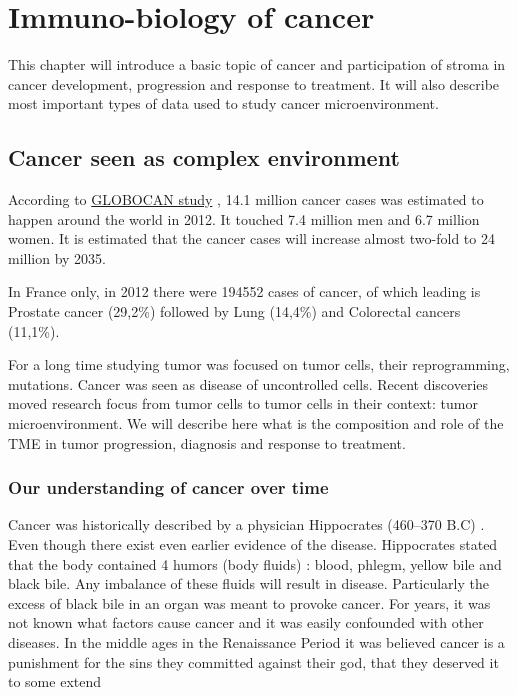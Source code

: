 \documentclass[12pt,]{book}
\theoremstyle{definition}
\theoremstyle{definition}
\theoremstyle{definition}
\theoremstyle{remark}
\begin{document}
{
\hypersetup{linkcolor=black}
\setcounter{tocdepth}{4}
\tableofcontents
}
\hypersetup{linkcolor=black}
\listoftables

\hypersetup{linkcolor=black}
\listoffigures
\hypertarget{intro}{%
\chapter{Immuno-biology of cancer}\label{intro}}

\setcounter{page}{11}

This chapter will introduce a basic topic of cancer and participation of
stroma in cancer development, progression and response to treatment. It
will also describe most important types of data used to study cancer
microenvironment.

\hypertarget{cancer-seen-as-complex-environment}{%
\section{Cancer seen as complex
environment}\label{cancer-seen-as-complex-environment}}

According to
\href{http://globocan.iarc.fr/Pages/fact_sheets_cancer.aspx}{GLOBOCAN
study} \citep{GLOBOCAN}, 14.1 million cancer cases was estimated to
happen around the world in 2012. It touched 7.4 million men and 6.7
million women. It is estimated that the cancer cases will increase
almost two-fold to 24 million by 2035.

In France only, in 2012 there were 194552 cases of cancer, of which
leading is Prostate cancer (29,2\%) followed by Lung (14,4\%) and
Colorectal cancers (11,1\%).

For a long time studying tumor was focused on tumor cells, their
reprogramming, mutations. Cancer was seen as disease of uncontrolled
cells. Recent discoveries moved research focus from tumor cells to tumor
cells in their context: tumor microenvironment. We will describe here
what is the composition and role of the TME in tumor progression,
diagnosis and response to treatment.

\hypertarget{our-understanding-of-cancer-over-time}{%
\subsection{Our understanding of cancer over
time}\label{our-understanding-of-cancer-over-time}}

Cancer was historically described by a physician Hippocrates (460--370
B.C) \citep{Sudhakar2009}. Even though there exist even earlier evidence
of the disease. Hippocrates stated that the body contained 4 humors
(body fluids) : blood, phlegm, yellow bile and black bile. Any imbalance
of these fluids will result in disease. Particularly the excess of black
bile in an organ was meant to provoke cancer. For years, it was not
known what factors cause cancer and it was easily confounded with other
diseases. In the middle ages in the Renaissance Period it was believed
cancer is a punishment for the sins they committed against their god,
that they deserved it to some extend
\end{document}
